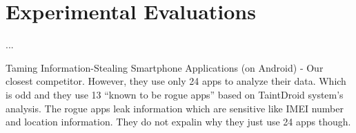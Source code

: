 \section{Experimental Evaluations}
...

Taming Information-Stealing Smartphone Applications (on Android) - Our closest competitor. However, they use only 24 apps to analyze their data. Which is odd and they use 13 ``known to be rogue apps'' based on TaintDroid system's analysis. The rogue apps leak information which are sensitive like IMEI number and location information. They do not expalin why they just use 24 apps though.